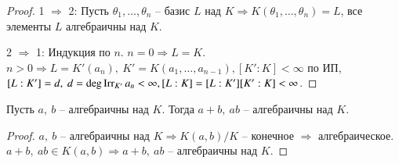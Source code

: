 \documentclass[main]{subfiles}
\begin{document}
\begin{proof}
    1 $\Rightarrow$ 2: Пусть $\theta_1, \ldots, \theta_n$ -- базис $L$ над $K \Rightarrow
    K(\theta_1, \ldots, \theta_n) = L$, все элементы $L$ алгебраичны над $K$.

    2 $\Rightarrow$ 1: Индукция по $n$. $n = 0 \Rightarrow L = K$.
    $n > 0 \Rightarrow L = K'(a_n), \ K' = K(a_1, \ldots, a_{n-1}),
    [K':K] < \infty$ по ИП, $[L:K'] = d, \ d = \deg \operatorname{Irr}_{K'}a_n < \infty, 
    [L:K] = [L:K'][K':K] < \infty$.
\end{proof}

\begin{corollary}
    Пусть $a, \ b$  -- алгебраичны над $K$. Тогда $a + b, \ ab$ -- алгебраичны над $K$. 
\end{corollary}
    
\begin{proof}
    $a, \ b$  -- алгебраичны над $K \Rightarrow K(a, b)/K$ -- конечное $\Rightarrow$ алгебраическое.
    $a+b, \ ab \in K(a, b) \Rightarrow a+b, \ ab$ -- алгебраичны над $K$.
\end{proof}
\end{document}
